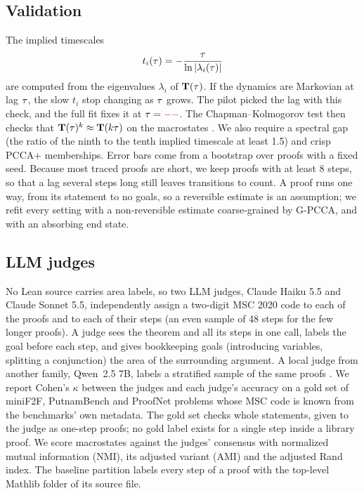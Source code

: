 \subsection{Validation}
The implied timescales
\begin{equation}
  t_i(\tau) = -\frac{\tau}{\ln |\lambda_i(\tau)|}
\end{equation}
are computed from the eigenvalues $\lambda_i$ of $\mathbf{T}(\tau)$. If the dynamics
are Markovian at lag $\tau$, the slow $t_i$ stop changing as $\tau$ grows. The
pilot picked the lag with this check, and the full fit fixes it at
$\tau = \textcolor{red}{--}$. The Chapman--Kolmogorov test then
checks that $\mathbf{T}(\tau)^k \approx \mathbf{T}(k\tau)$ on the macrostates
\citep{prinz2011markov}. We also require a spectral gap (the ratio of the
ninth to the tenth implied timescale at least 1.5) and crisp PCCA+
memberships. Error bars come from a bootstrap over proofs with a
fixed seed. Because most traced proofs are short, we keep proofs with at
least 8 steps, so that a lag several steps long still leaves transitions to
count. A proof runs one way, from its statement to no goals, so a reversible
estimate is an assumption; we refit every setting with a non-reversible
estimate coarse-grained by G-PCCA, and with an absorbing end state.

\subsection{LLM judges}
No Lean source carries area labels, so two LLM judges, Claude Haiku 5.5 and
Claude Sonnet 5.5, independently assign a two-digit MSC 2020 code
\citep{msc2020} to each of the \resNumProofs{} proofs and to each of their steps
(an even sample of 48 steps for the few longer proofs). A judge sees the
theorem and all its steps in one call, labels the goal before each step, and
gives bookkeeping goals (introducing variables, splitting a conjunction) the
area of the surrounding argument. A local judge from another family,
Qwen~2.5 7B, labels a stratified sample of the same proofs .
We report Cohen's $\kappa$ between the judges and each judge's accuracy on a
gold set of \resGoldProblems{} miniF2F, PutnamBench and ProofNet problems whose
MSC code is known from the benchmarks' own metadata. The gold set checks
whole statements, given to the judge as one-step proofs; no gold label
exists for a single step inside a library proof. We score macrostates against the
judges' consensus with normalized mutual information (NMI), its adjusted
variant (AMI) and the adjusted Rand index. The baseline partition labels every
step of a proof with the top-level Mathlib folder of its source file.
